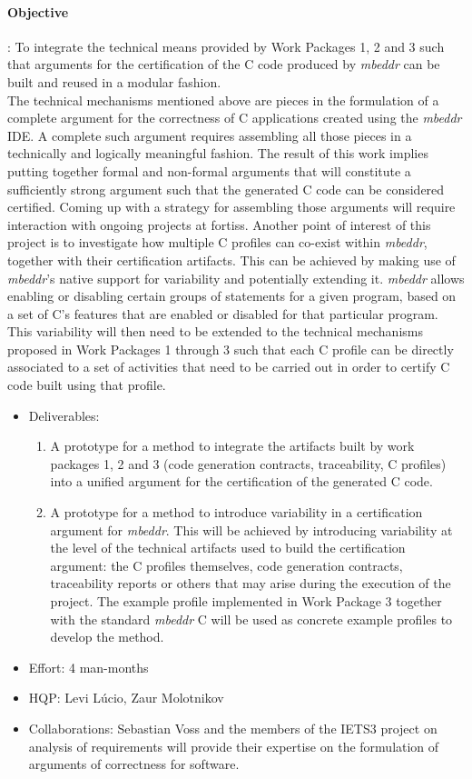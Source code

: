 \paragraph{\textbf{Objective}}: To integrate the technical means provided by
Work Packages 1, 2 and 3 such that arguments for the certification of the C code
produced by \emph{mbeddr} can be built and reused in a modular
fashion.\vspace{.2cm}\\
The technical mechanisms mentioned above are pieces in the formulation of a
complete argument for the correctness of C applications created using the
\emph{mbeddr} IDE.
A complete such argument requires assembling all those pieces in a technically and logically meaningful fashion. The result of
this work implies putting together formal and non-formal arguments that will
constitute a sufficiently strong argument such that the generated C code can be
considered certified.
Coming up with a strategy for assembling those arguments will require
interaction with ongoing projects at fortiss. Another point of interest of
this project is to investigate how multiple C profiles can co-exist within
\emph{mbeddr}, together with their certification artifacts. This can
be achieved by making use of \emph{mbeddr}'s native support for variability and
potentially extending it. \emph{mbeddr} allows enabling or disabling certain
groups of statements for a given program, based on a set of C's features that
are enabled or disabled for that particular program.
This variability will then need to be extended to the technical mechanisms
proposed in Work Packages 1 through 3 such that each C profile can be directly
associated to a set of activities that need to be carried out in order to
certify C code built using that profile.

\begin{itemize}
  \item Deliverables:
  \begin{enumerate}
    \item A prototype for a method to integrate the artifacts built by work
    packages 1, 2 and 3 (code generation contracts, traceability, C profiles)
    into a unified argument for the certification of the generated C code.
\item A prototype for a method to introduce variability in a certification
argument for \emph{mbeddr}. This will be achieved by introducing variability at
the level of the technical artifacts used to build the certification argument:
the C profiles themselves, code generation contracts, traceability reports or
others that may arise during the execution of the project. The example profile implemented in
Work Package 3 together with the standard \emph{mbeddr} C will be used as
concrete example profiles to develop the method.
  \end{enumerate}
  \item Effort: 4 man-months
  \item HQP: Levi L\'ucio, Zaur Molotnikov
  \item Collaborations: Sebastian Voss and the members of the IETS3 project on
  analysis of requirements will provide their expertise on the formulation of
  arguments of correctness for software.
\end{itemize}